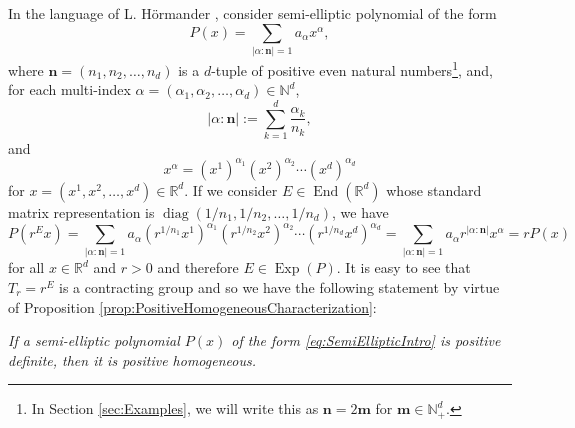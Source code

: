 \documentclass[11pt, letter]{book}
\newenvironment{example}
  {\pushQED{\qed}\renewcommand{\qedsymbol}{$\triangle$}\examplex}
  {\popQED\endexamplex}
\newcommand\End{\operatorname{End}} %
\newcommand\Exp{\operatorname{Exp}}
\newcommand\diag{\operatorname{diag}}
\begin{document}
\begin{example}\label{exp:Polynomial}\normalfont
In the language of L. H\"{o}rmander \cite{hormander_analysis_1983}, consider semi-elliptic polynomial of the form
\begin{equation}\label{eq:SemiEllipticIntro}
    P(x)=\sum_{|\alpha:\mathbf{n}|=1}a_\alpha x^\alpha,
\end{equation}
where $\mathbf{n}=(n_1,n_2,\dots,n_d)$ is a $d$-tuple of positive even natural numbers\footnote{In Section \ref{sec:Examples}, we will write this as $\mathbf{n}=2\mathbf{m}$ for $\mathbf{m}\in\mathbb{N}_+^d$.}, and, for each multi-index $\alpha =(\alpha_1,\alpha_2,\dots,\alpha_d)\in\mathbb{N}^d$,
\begin{equation*}
    |\alpha:\mathbf{n}|:=\sum_{k=1}^d\frac{\alpha_k}{n_k},
\end{equation*}
and
\begin{equation*}
    x^\alpha=\left(x^1\right)^{\alpha_1}\left(x^2\right)^{\alpha_2}\cdots\left(x^d\right)^{\alpha_d}
\end{equation*}
for $x=\left(x^1,x^2,\dots,x^d\right)\in\mathbb{R}^d$. If we consider $E\in\End(\mathbb{R}^d)$ whose standard matrix representation is $\diag(1/n_1,1/n_2,\dots,1/n_d)$, we have
\begin{equation*}
    P\left(r^Ex\right)=\sum_{|\alpha:\mathbf{n}|=1}a_{\alpha}\left(r^{1/n_1}x^1\right)^{\alpha_1}\left(r^{1/n_2}x^2\right)^{\alpha_2}\cdots\left(r^{1/n_d}x^d\right)^{\alpha_d}=\sum_{|\alpha:\mathbf{n}|=1}a_\alpha r^{|\alpha:\mathbf{n}|}x^\alpha=rP(x)
\end{equation*}
for all $x\in\mathbb{R}^d$ and $r>0$ and therefore $E\in\Exp(P)$. It is easy to see that $T_r=r^E$ is a contracting group and so we have the following statement by virtue of Proposition \ref{prop:PositiveHomogeneousCharacterization}: \begin{center}\textit{If a semi-elliptic polynomial $P(x)$ of the form \eqref{eq:SemiEllipticIntro} is positive definite, then it is positive homogeneous.}
\end{center}


\end{example}
\end{document}
